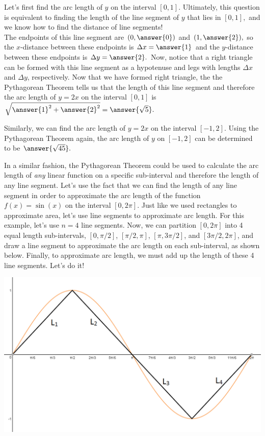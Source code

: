 \documentclass[handout,nooutcomes]{ximera}
\begin{document}
\begin{problem}
Let's first find the arc length of $y$ on the interval $[0,1]$.  Ultimately, this question is equivalent to finding the length of the line segment of $y$ that lies in $[0,1],$ and we know how to find the distance of line segments!  \\ 

The endpoints of this line segment are $(0,\answer{0})$ and $(1,\answer{2}),$ so the $x$-distance between these endpoints is $\Delta x = \answer{1}$ and the $y$-distance between these endpoints is $\Delta y = \answer{2}.$  Now, notice that a right triangle can be formed with this line segment as a hypotenuse and legs with lengths $\Delta x$ and $\Delta y$, respectively.  Now that we have formed right triangle, the the Pythagorean Theorem tells us that the length of this line segment and therefore the arc length of $y = 2x$ on the interval $[0,1]$ is $\sqrt{{\answer{1}}^2+{\answer{2}}^2} = \answer{\sqrt{5}}.$
\end{problem}

\begin{problem}
Similarly, we can find the arc length of $y=2x$ on the interval $[-1,2].$  Using the Pythagorean Theorem again, the arc length of $y$ on $[-1,2]$ can be determined to be $\answer{\sqrt{45}}.$
\end{problem}

In a similar fashion, the Pythagorean Theorem could be used to calculate the arc length of \textit{any} linear function on a specific sub-interval and therefore the length of any line segment.  Let's use the fact that we can find the length of any line segment in order to approximate the arc length of the function $f(x) = \sin(x)$ on the interval $[0, 2\pi]$.  Just like we used rectangles to approximate area, let's use line segments to approximate arc length.  For this example, let's use $n=4$ line segments.  Now, we can partition $[0, 2\pi]$ into 4 equal length sub-intervals, $[0, \pi/2]$, $[\pi/2, \pi]$, $[\pi, 3\pi/2]$, and $[3\pi/2, 2\pi]$, and draw a line segment to approximate the arc length on each sub-interval, as shown below.  Finally, to approximate arc length, we must add up the length of these 4 line segments.  Let's do it! \\

\begin{center} \includegraphics{sinxsegments.png} \end{center}
\end{document}
